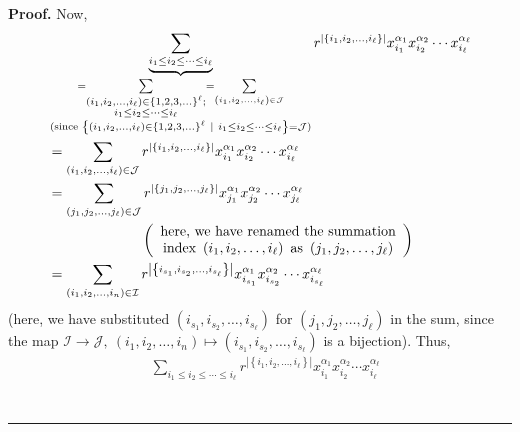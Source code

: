 \documentclass[numbers=enddot,12pt,final,onecolumn,notitlepage]{scrartcl}%
\theoremstyle{definition}
\newenvironment{proof}[1][Proof]{\noindent\textbf{#1.} }{\ \rule{0.5em}{0.5em}}
\let\sumnonlimits\sum
\renewcommand{\sum}{\sumnonlimits\limits}
\newenvironment{verlong}{}{}
\begin{document}
\begin{verlong}
\begin{proof}
Now,
\begin{align*}
&  \underbrace{\sum_{i_{1}\leq i_{2}\leq\cdots\leq i_{\ell}}}_{\substack{=\sum
_{\substack{\left(  i_{1},i_{2},\ldots,i_{\ell}\right)  \in\left\{
1,2,3,\ldots\right\}  ^{\ell};\\i_{1}\leq i_{2}\leq\cdots\leq i_{\ell}}%
}=\sum_{\left(  i_{1},i_{2},\ldots,i_{\ell}\right)  \in\mathcal{J}%
}\\\text{(since }\left\{  \left(  i_{1},i_{2},\ldots,i_{\ell}\right)
\in\left\{  1,2,3,\ldots\right\}  ^{\ell}\ \mid\ i_{1}\leq i_{2}\leq\cdots\leq
i_{\ell}\right\}  =\mathcal{J}\text{)}}}r^{\left\vert \left\{  i_{1}%
,i_{2},\ldots,i_{\ell}\right\}  \right\vert }x_{i_{1}}^{\alpha_{1}}x_{i_{2}%
}^{\alpha_{2}}\cdots x_{i_{\ell}}^{\alpha_{\ell}}\\
&  =\sum_{\left(  i_{1},i_{2},\ldots,i_{\ell}\right)  \in\mathcal{J}%
}r^{\left\vert \left\{  i_{1},i_{2},\ldots,i_{\ell}\right\}  \right\vert
}x_{i_{1}}^{\alpha_{1}}x_{i_{2}}^{\alpha_{2}}\cdots x_{i_{\ell}}^{\alpha
_{\ell}}\\
&  =\sum_{\left(  j_{1},j_{2},\ldots,j_{\ell}\right)  \in\mathcal{J}%
}r^{\left\vert \left\{  j_{1},j_{2},\ldots,j_{\ell}\right\}  \right\vert
}x_{j_{1}}^{\alpha_{1}}x_{j_{2}}^{\alpha_{2}}\cdots x_{j_{\ell}}^{\alpha
_{\ell}}\\
&  \ \ \ \ \ \ \ \ \ \ \ \ \ \ \ \ \ \ \ \ \left(
\begin{array}
[c]{c}%
\text{here, we have renamed the summation}\\
\text{index }\left(  i_{1},i_{2},\ldots,i_{\ell}\right)  \text{ as }\left(
j_{1},j_{2},\ldots,j_{\ell}\right)
\end{array}
\right) \\
&  =\sum_{\left(  i_{1},i_{2},\ldots,i_{n}\right)  \in\mathcal{I}%
}r^{\left\vert \left\{  i_{s_{1}},i_{s_{2}},\ldots,i_{s_{\ell}}\right\}
\right\vert }x_{i_{s_{1}}}^{\alpha_{1}}x_{i_{s_{2}}}^{\alpha_{2}}\cdots
x_{i_{s_{\ell}}}^{\alpha_{\ell}}%
\end{align*}
(here, we have substituted $\left(  i_{s_{1}},i_{s_{2}},\ldots,i_{s_{\ell}%
}\right)  $ for $\left(  j_{1},j_{2},\ldots,j_{\ell}\right)  $ in the sum,
since the map $\mathcal{I}\rightarrow\mathcal{J},\ \left(  i_{1},i_{2}%
,\ldots,i_{n}\right)  \mapsto\left(  i_{s_{1}},i_{s_{2}},\ldots,i_{s_{\ell}%
}\right)  $ is a bijection). Thus,%
\begin{align*}
&  \sum_{i_{1}\leq i_{2}\leq\cdots\leq i_{\ell}}r^{\left\vert \left\{
i_{1},i_{2},\ldots,i_{\ell}\right\}  \right\vert }x_{i_{1}}^{\alpha_{1}%
}x_{i_{2}}^{\alpha_{2}}\cdots x_{i_{\ell}}^{\alpha_{\ell}}\\

\end{align*}
\end{proof}
\end{verlong}
\end{document}
